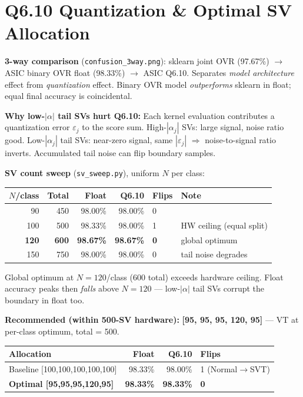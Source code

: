 \documentclass[10pt]{article}
\begin{document}
\section{Q6.10 Quantization \& Optimal SV Allocation}

\textbf{3-way comparison} (\texttt{confusion\_3way.png}):
sklearn joint OVR (97.67\%) $\to$ ASIC binary OVR float (98.33\%) $\to$ ASIC Q6.10.
Separates \emph{model architecture} effect from \emph{quantization} effect.
Binary OVR model \emph{outperforms} sklearn in float; equal final accuracy is coincidental.

\textbf{Why low-$|\alpha|$ tail SVs hurt Q6.10:}
Each kernel evaluation contributes a quantization error $\varepsilon_j$ to the score sum.
High-$|\alpha_j|$ SVs: large signal, noise ratio good.
Low-$|\alpha_j|$ tail SVs: near-zero signal, same $|\varepsilon_j|$ $\Rightarrow$
noise-to-signal ratio inverts. Accumulated tail noise can flip boundary samples.

\textbf{SV count sweep} (\texttt{sv\_sweep.py}), uniform $N$ per class:

\begin{center}
\small
\begin{tabular}{rrrrll}
\toprule
$N$/class & Total & Float & Q6.10 & Flips & Note \\
\midrule
90 & 450 & 98.00\% & 98.00\% & 0 & \\
100 & 500 & 98.33\% & 98.00\% & 1 & HW ceiling (equal split) \\
\textbf{120} & \textbf{600} & \textbf{98.67\%} & \textbf{98.67\%} & \textbf{0} & global optimum \\
150 & 750 & 98.00\% & 98.00\% & 0 & tail noise degrades \\
\bottomrule
\end{tabular}
\end{center}

Global optimum at $N=120$/class (600 total) exceeds hardware ceiling.
Float accuracy peaks then \emph{falls} above $N=120$ --- low-$|\alpha|$ tail SVs
corrupt the boundary in float too.

\textbf{Recommended (within 500-SV hardware):}
\textbf{[95, 95, 95, 120, 95]} --- VT at per-class optimum, total = 500.

\begin{center}
\small
\begin{tabular}{lrrl}
\toprule
Allocation & Float & Q6.10 & Flips \\
\midrule
Baseline [100,100,100,100,100] & 98.33\% & 98.00\% & 1 (Normal$\to$SVT) \\
\textbf{Optimal [95,95,95,120,95]} & \textbf{98.33\%} & \textbf{98.33\%} & \textbf{0} \\
\bottomrule
\end{tabular}
\end{center}
\end{document}
